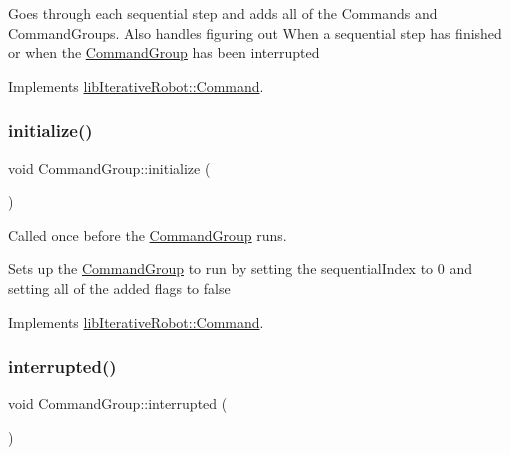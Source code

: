 Goes through each sequential step and adds all of the Commands and Command\+Groups. Also handles figuring out When a sequential step has finished or when the \mbox{\hyperlink{classlib_iterative_robot_1_1_command_group}{Command\+Group}} has been interrupted 

Implements \mbox{\hyperlink{classlib_iterative_robot_1_1_command_a4b38164af1a8645fae2fdae296317cf4}{lib\+Iterative\+Robot\+::\+Command}}.

\mbox{\label{classlib_iterative_robot_1_1_command_group_a99800c5dbd05ab750aa0bb27518d0467}} 
\subsubsection{\texorpdfstring{initialize()}{initialize()}}
{\footnotesize\ttfamily void Command\+Group\+::initialize (\begin{DoxyParamCaption}{ }\end{DoxyParamCaption})\hspace{0.3cm}{\ttfamily [virtual]}}



Called once before the \mbox{\hyperlink{classlib_iterative_robot_1_1_command_group}{Command\+Group}} runs. 

Sets up the \mbox{\hyperlink{classlib_iterative_robot_1_1_command_group}{Command\+Group}} to run by setting the sequential\+Index to 0 and setting all of the added flags to false 

Implements \mbox{\hyperlink{classlib_iterative_robot_1_1_command_a14543c9d38b07e52f9ffb2af88a63f60}{lib\+Iterative\+Robot\+::\+Command}}.

\mbox{\label{classlib_iterative_robot_1_1_command_group_a5174a8e63675bead12b84e39df0ae90e}} 
\subsubsection{\texorpdfstring{interrupted()}{interrupted()}}
{\footnotesize\ttfamily void Command\+Group\+::interrupted (\begin{DoxyParamCaption}{ }\end{DoxyParamCaption})\hspace{0.3cm}{\ttfamily [virtual]}}



